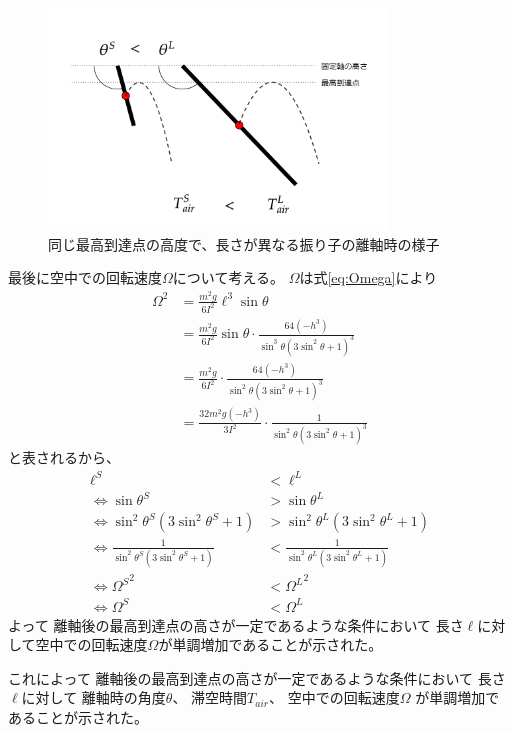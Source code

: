 \documentclass[a4paper,11pt]{jsarticle}
\begin{document}
\begin{figure}[h]
  \centering
  \includegraphics[width = 0.8\textwidth]{same_max_height.png}
  \caption{同じ最高到達点の高度で、長さが異なる振り子の離軸時の様子}
  \label{same_max_height.png}
\end{figure}

最後に空中での回転速度$\Omega$について考える。
$\Omega$は式\ref{eq:Omega}により
\begin{align*}
  \Omega^2 
  &= \frac{m^2g}{6I^2}\ell^3\sin\theta
  \\
  &= \frac{m^2g}{6I^2}\sin\theta \cdot \frac{64(-h^3)}{\sin^3\theta(3\sin^2\theta+1)^3}
  \\
  &= \frac{m^2g}{6I^2}\cdot \frac{64(-h^3)}{\sin^2\theta(3\sin^2\theta+1)^3}
  \\
  &= \frac{32m^2g (-h^3)}{3I^2}\cdot \frac{1}{\sin^2\theta(3\sin^2\theta+1)^3}
\end{align*}
と表されるから、
\begin{align*}
  \ell^S &< \ell^L
  \\
  \Leftrightarrow
  \sin\theta^S &> \sin\theta^L
  \\
  \Leftrightarrow
  \sin^2\theta^S(3\sin^2\theta^S + 1) &> \sin^2\theta^L(3\sin^2\theta^L + 1)
  \\
  \Leftrightarrow
  \frac{1}{\sin^2\theta^S(3\sin^2\theta^S + 1)} &< \frac{1}{\sin^2\theta^L(3\sin^2\theta^L + 1)}
  \\
  \Leftrightarrow
  {\Omega^S}^2 &< {\Omega^L}^2
  \\
  \Leftrightarrow
  \Omega^S &< \Omega^L
\end{align*}
よって
離軸後の最高到達点の高さが一定であるような条件において
長さ$\ell$に対して空中での回転速度$\Omega$が単調増加であることが示された。

これによって
離軸後の最高到達点の高さが一定であるような条件において
長さ$\ell$に対して
離軸時の角度$\theta$、
滞空時間$T_{air}$、
空中での回転速度$\Omega$
が単調増加であることが示された。
\end{document}
